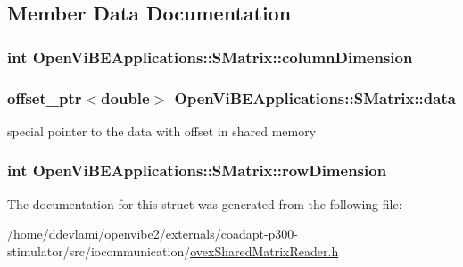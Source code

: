 \subsection{Member Data Documentation}
\hypertarget{structOpenViBEApplications_1_1SMatrix_a89840ca15bb5cd21e8e23482b16cc89a}{
\subsubsection[{columnDimension}]{\setlength{\rightskip}{0pt plus 5cm}int {\bf OpenViBEApplications::SMatrix::columnDimension}}}
\label{structOpenViBEApplications_1_1SMatrix_a89840ca15bb5cd21e8e23482b16cc89a}
\hypertarget{structOpenViBEApplications_1_1SMatrix_a21a4aac7ccb571434a2398588857b833}{
\subsubsection[{data}]{\setlength{\rightskip}{0pt plus 5cm}offset\_\-ptr$<$double$>$ {\bf OpenViBEApplications::SMatrix::data}}}
\label{structOpenViBEApplications_1_1SMatrix_a21a4aac7ccb571434a2398588857b833}
special pointer to the data with offset in shared memory \hypertarget{structOpenViBEApplications_1_1SMatrix_ac01b7e7a3b15eea20921a344bed3c5c6}{
\subsubsection[{rowDimension}]{\setlength{\rightskip}{0pt plus 5cm}int {\bf OpenViBEApplications::SMatrix::rowDimension}}}
\label{structOpenViBEApplications_1_1SMatrix_ac01b7e7a3b15eea20921a344bed3c5c6}


The documentation for this struct was generated from the following file:\begin{DoxyCompactItemize}
\item 
/home/ddevlami/openvibe2/externals/coadapt-\/p300-\/stimulator/src/iocommunication/\hyperlink{ovexSharedMatrixReader_8h}{ovexSharedMatrixReader.h}\end{DoxyCompactItemize}
